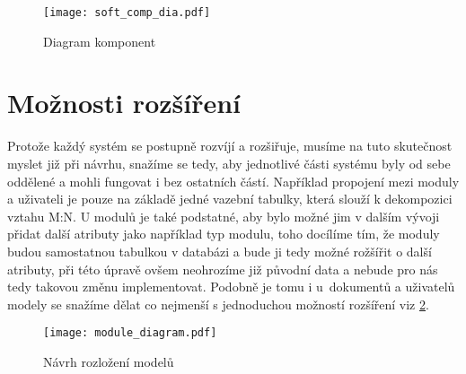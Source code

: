 \begin{figure}[H]
    \centering
    \texttt{[image: soft\_comp\_dia.pdf]}
    \caption{Diagram komponent}
    \label{fig:softCompDia}
\end{figure}

\section{Možnosti rozšíření}

Protože každý systém se postupně rozvíjí a rozšiřuje, musíme na tuto skutečnost myslet již při návrhu, snažíme se tedy, aby jednotlivé části systému byly od sebe
oddělené a mohli fungovat i bez ostatních částí. Například propojení mezi moduly a uživateli je pouze na základě jedné vazební tabulky, která slouží k dekompozici vztahu
M:N. U modulů je také podstatné, aby bylo možné jim v dalším vývoji přidat další atributy jako například typ modulu, toho docílíme tím, že moduly budou samostatnou tabulkou v databázi
a bude ji tedy možné rožšířit o další atributy, při této úpravě ovšem neohrozíme již původní data a nebude pro nás tedy takovou změnu implementovat. Podobně je tomu i u~dokumentů a uživatelů
modely se snažíme dělat co nejmenší s jednoduchou možností rozšíření viz \ref{fig:moduleDia}.

\begin{figure}[h]
    \centering
    \texttt{[image: module\_diagram.pdf]}
    \caption{Návrh rozložení modelů}
    \label{fig:moduleDia}
\end{figure}
